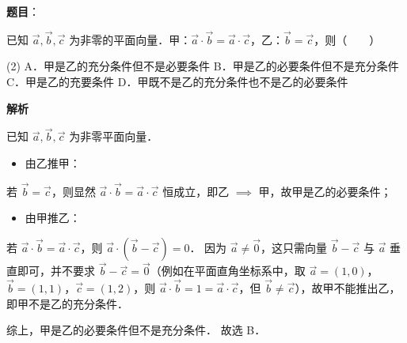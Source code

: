 \begin{answer}

\textbf{题目}：

已知 $\vec{a}, \vec{b}, \vec{c}$ 为非零的平面向量．甲：$\vec{a} \cdot \vec{b} = \vec{a} \cdot \vec{c}$，乙：$\vec{b} = \vec{c}$，则\mbox{（　　）}

\begin{gkopts}(2)
\task A．甲是乙的充分条件但不是必要条件
\task B．甲是乙的必要条件但不是充分条件
\task C．甲是乙的充要条件
\task D．甲既不是乙的充分条件也不是乙的必要条件
\end{gkopts}

\textbf{解析}

已知 $\vec{a}, \vec{b}, \vec{c}$ 为非零平面向量．
\begin{itemize}
\item 由乙推甲：
\end{itemize}
  若 $\vec{b} = \vec{c}$，则显然 $\vec{a} \cdot \vec{b} = \vec{a} \cdot \vec{c}$ 恒成立，即乙 $\implies$ 甲，故甲是乙的必要条件；
\begin{itemize}
\item 由甲推乙：
\end{itemize}
  若 $\vec{a} \cdot \vec{b} = \vec{a} \cdot \vec{c}$，则 $\vec{a} \cdot (\vec{b} - \vec{c}) = 0$．
  因为 $\vec{a} \neq \vec{0}$，这只需向量 $\vec{b} - \vec{c}$ 与 $\vec{a}$ 垂直即可，并不要求 $\vec{b} - \vec{c} = \vec{0}$（例如在平面直角坐标系中，取 $\vec{a} = (1, 0)$，$\vec{b} = (1, 1)$，$\vec{c} = (1, 2)$，则 $\vec{a} \cdot \vec{b} = 1 = \vec{a} \cdot \vec{c}$，但 $\vec{b} \neq \vec{c}$），故甲不能推出乙，即甲不是乙的充分条件．

综上，甲是乙的必要条件但不是充分条件．
故选 B．


\end{answer}
